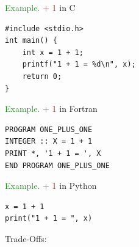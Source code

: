 \documentclass[
    xcolor={svgnames,dvipsnames},
    hyperref={colorlinks, citecolor=DeepPink4, linkcolor=DarkRed, urlcolor=DarkBlue}
    ]{beamer}  %
\newcommand{\Eg}{\textcolor{ForestGreen}{Example. }}
\newcommand{\brown}[1]{\textcolor{Brown}{\sf #1}}
\newcommand{\1}{\mathbbm 1}
\begin{document}
\begin{frame}[fragile]

    \Eg \brown{1 + 1} in C

    {\small
    \begin{verbatim}
#include <stdio.h>
int main() {
    int x = 1 + 1;
    printf("1 + 1 = %d\n", x);
    return 0;
}   
    \end{verbatim}
    }

\end{frame}



\begin{frame}[fragile]

    \Eg \brown{1 + 1} in Fortran

    {\small
    \begin{verbatim}
PROGRAM ONE_PLUS_ONE  
INTEGER :: X = 1 + 1 
PRINT *, '1 + 1 = ', X
END PROGRAM ONE_PLUS_ONE 
    \end{verbatim}
    }

\end{frame}




\begin{frame}[fragile]

    \Eg \brown{1 + 1} in Python

    {\small
    \begin{verbatim}
x = 1 + 1
print("1 + 1 = ", x)
    \end{verbatim}
    }

\end{frame}



\begin{frame}

    Trade-Offs:

    \begin{figure}
       \begin{center}
       \end{center}
    \end{figure}

\end{frame}
\end{document}
